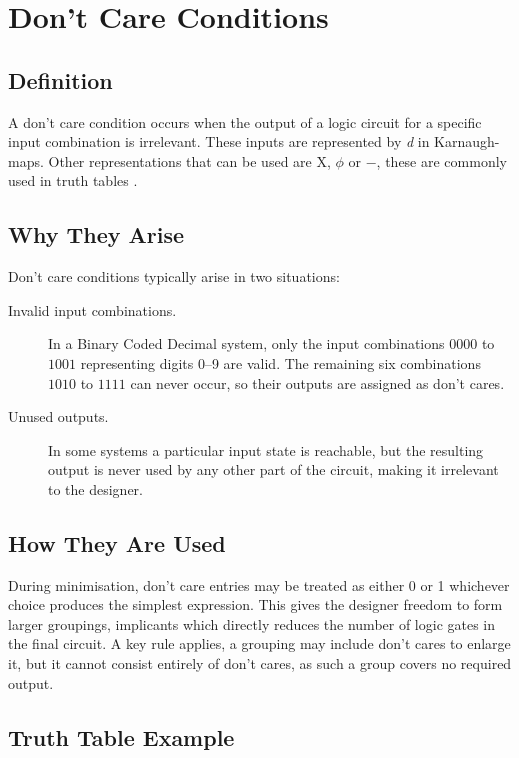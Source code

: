\section{Don't Care Conditions}

\subsection{Definition}
A don't care condition occurs when the output of a logic circuit for a
specific input combination is irrelevant. These inputs are represented by \textit{d}
in Karnaugh-maps. Other representations that can be used are X, $\phi$
or $-$, these are commonly used in truth tables \cite{floyd2015}.

\subsection{Why They Arise}

Don't care conditions typically arise in two situations:

\begin{description}
    \item[Invalid input combinations.] In a Binary Coded Decimal
    system, only the input combinations \(0000\) to \(1001\) representing
    digits 0--9 are valid. The remaining six combinations \(1010\) to
    \(1111\) can never occur, so their outputs are assigned as don't cares.

    \item[Unused outputs.] In some systems a particular input state is
    reachable, but the resulting output is never used by any other part of
    the circuit, making it irrelevant to the designer.
\end{description}

\subsection{How They Are Used}

During minimisation, don't care entries may be treated as either 0 or 1 
whichever choice produces the simplest expression. This gives the designer
freedom to form larger groupings, implicants  which directly
reduces the number of logic gates in the final circuit. A key rule applies,
a grouping may include don't cares to enlarge it, but it cannot
consist entirely of don't cares, as such a group covers no required
output.

\subsection{Truth Table Example}

